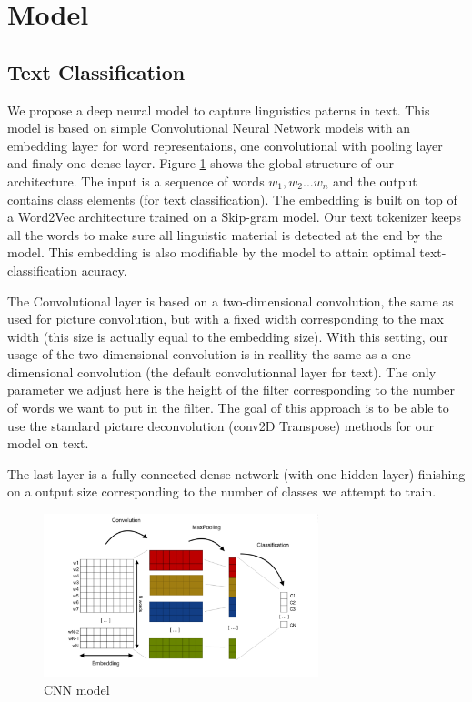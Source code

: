\section{Model}

\subsection{Text Classification}

We propose a deep neural model to capture linguistics paterns in text. This model is based on simple Convolutional Neural Network models with an embedding layer for word representaions, one convolutional with pooling layer and finaly one dense layer. Figure \ref{cnn} shows the global structure of our architecture. The input is a sequence of words $ w_{1}, w_{2} ... w_{n} $ and the output contains class elements (for text classification). The embedding is built on top of a Word2Vec architecture trained on a Skip-gram model. Our text tokenizer keeps all the words to make sure all linguistic material is detected at the end by the model. This embedding is also modifiable by the model to attain optimal text-classification acuracy. 

The Convolutional layer is based on a two-dimensional convolution, the same as used for picture convolution, but with a fixed width corresponding to the max width (this size is actually equal to the embedding size). With this setting, our usage of the two-dimensional convolution is in reallity the same as a one-dimensional convolution (the default convolutionnal layer for text). The only parameter we adjust here is the height of the filter corresponding to the number of words we want to put in the filter. The goal of this approach is to be able to use the standard picture deconvolution (conv2D Transpose) methods for our model on text.

The last layer is a fully connected dense network (with one hidden layer) finishing on a output size corresponding to the number of classes we attempt to train.

\begin{figure}[h]
\begin{center}
\includegraphics[width=8cm]{img/model_classif.png}
\caption{CNN model}
\label{cnn}
\end{center}
\end{figure}

